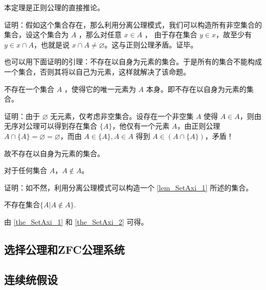本定理是正则公理的直接推论。

证明：假如这个集合存在，那么利用分离公理模式，我们可以构造所有非空集合的集合，设这个集合为 $A$ ，那么对任意 $x\in A$ ， 由于存在集合 $y\in x$，故至少有 $y\in x\cap A$，也就是说 $x\cap A\neq\varnothing$。这与正则公理矛盾。证毕。

也可以用下面证明的引理：不存在以自身为元素的集合。于是所有的集合不能构成一个集合，否则其将以自己为元素，这样就解决了该命题。

\begin{lemma}{}\label{lem_SetAxi_1}
不存在一个集合 $A$ ，使得它的唯一元素为 $A$ 本身。即不存在以自身为元素的集合。
\end{lemma}

证明：由于 $\varnothing$ 无元素，仅考虑非空集合。设存在一个非空集 $A$ 使得 $A \in A$，则由无序对公理可以得到存在集合 $\{A\}$，他仅有一个元素 $A$，由正则公理 $A\cap \{A\} = \varnothing = \varnothing$，而由 $A \in \{A\}, A \in A$ 得到 $A \in (A \cap \{A\})$，矛盾！

故不存在以自身为元素的集合。

\begin{theorem}{}\label{the_SetAxi_2}
对于任何集合 $A$，$A\notin A$。
\end{theorem}

证明：如不然，利用分离公理模式可以构造一个 \autoref{lem_SetAxi_1} 所述的集合。

\begin{theorem}{}
不存在集合$\{A|A\notin A\}$.
\end{theorem}

由 \autoref{the_SetAxi_1} 和 \autoref{the_SetAxi_2} 可得。

\subsection{选择公理和ZFC公理系统}

\subsection{连续统假设}



